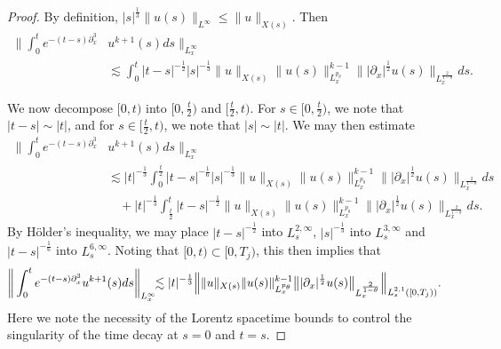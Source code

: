 \documentclass[10pt, reqno]{amsart}
\numberwithin{equation}{section}
\theoremstyle{definition}
\theoremstyle{remark}
\begin{document}
\begin{proof}
    By definition, $|s|^{\frac{1}{3}}\|u(s)\|_{L^\infty} \leq \|u\|_{X(s)}$. Then
    \begin{equation}\label{proof/failure 2}
        \begin{split}
        \bigg\|\int_0^t e^{-(t-s)\partial^3_x}& u^{k+1}(s)ds\bigg\|_{L_x^\infty} \\
         & \lesssim \int_0^t |t-s|^{-\frac{1}{2}}|s|^{-\frac{1}{3}}\|u\|_{X(s)} \|u(s)\|_{L_x^{p_\theta}}^{k-1} \big\||\partial_x|^{\frac{1}{2}}u(s)\big\|_{L_x^\frac{2}{1-\theta}}ds.
         \end{split}
    \end{equation}

    We now decompose $ [0,t) $ into $[0,\frac{t}{2})$ and $[\frac{t}{2},t)$. For $s \in  [0,\frac{t}{2}) $, we note that $|t-s| \sim |t|$, and for $s \in [\frac{t}{2},t)$, we note that $|s| \sim |t|$. We may then estimate
    \begin{equation*}\begin{split}
        \bigg\|\int_0^t e^{-(t-s)\partial^3_x}& u^{k+1}(s)ds\bigg\|_{L_x^\infty}\\
         & \lesssim |t|^{-\frac{1}{3}}\int_0^{\frac{t}{2}} |t-s|^{-\frac{1}{6}}|s|^{-\frac{1}{3}}\|u\|_{X(s)} \|u(s)\|_{L_x^{p_\theta}}^{k-1} \big\||\partial_x|^{\frac{1}{2}}u(s)\big\|_{L_x^\frac{2}{1-\theta}}ds \\
         & \hspace{11pt} + |t|^{-\frac{1}{3}}\int_{\frac{t}{2}}^t |t-s|^{-\frac{1}{2}}\|u\|_{X(s)} \|u(s)\|_{L_x^{p_\theta}}^{k-1} \big\||\partial_x|^{\frac{1}{2}}u(s)\big\|_{L_x^\frac{2}{1-\theta}}ds.
    \end{split}\end{equation*}
    By H\"older's inequality, we may place $|t-s|^{-\frac{1}{2}}$ into $L_s^{2,\infty}$, $|s|^{-\frac{1}{3}}$ into $L_s^{3,\infty}$ and $|t-s|^{-\frac{1}{6}}$ into $L_s^{6,\infty}$. Noting that $[0,t) \subset [0,T_j)$, this then implies that
    \begin{align*}
        \bigg\|\int_0^t e^{-(t-s)\partial^3_x}u^{k+1}(s)ds\bigg\|_{L_x^\infty}\hspace{-4pt}
         & \lesssim |t|^{-\frac{1}{3}}\Big\|\|u\|_{X(s)} \|u(s)\|_{L_x^{p_\theta}}^{k-1} \big\||\partial_x|^{\frac{1}{2}}u(s)\big\|_{L_x^\frac{2}{1-\theta}}\Big\|_{L_s^{2,1}([0,T_j))}.
    \end{align*}
    Here we note the necessity of the Lorentz spacetime bounds to control the singularity of the time decay at $s = 0$ and $t = s$.


\end{proof}
\end{document}

